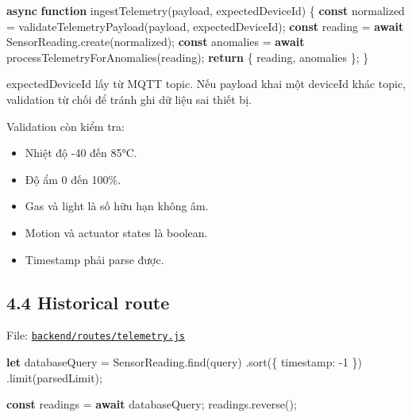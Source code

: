 \documentclass[11pt,oneside,openany]{book}
\renewcommand{\texttt}[1]{{\ttfamily\small #1}}
\newenvironment{Shaded}{\begin{snugshade}}{\end{snugshade}}
\newcommand{\ControlFlowTok}[1]{\textcolor[rgb]{0.99,0.74,0.29}{\textbf{#1}}}
\newcommand{\DataTypeTok}[1]{\textcolor[rgb]{0.16,0.50,0.73}{#1}}
\newcommand{\DecValTok}[1]{\textcolor[rgb]{0.96,0.45,0.00}{#1}}
\newcommand{\FunctionTok}[1]{\textcolor[rgb]{0.56,0.27,0.68}{#1}}
\newcommand{\KeywordTok}[1]{\textcolor[rgb]{0.81,0.81,0.76}{\textbf{#1}}}
\newcommand{\NormalTok}[1]{\textcolor[rgb]{0.81,0.81,0.76}{#1}}
\newcommand{\OperatorTok}[1]{\textcolor[rgb]{0.81,0.81,0.76}{#1}}
\renewenvironment{Shaded}{%
  \def\FrameCommand{\fboxsep=8pt\colorbox{shadecolor}}%
  \MakeFramed{\advance\hsize-\width\FrameRestore}%
}{\endMakeFramed}
\providecommand{\tightlist}{\setlength{\itemsep}{1pt}\setlength{\parskip}{0pt}}
\begin{document}
\begin{Shaded}
\begin{Highlighting}[]
\KeywordTok{async} \KeywordTok{function} \FunctionTok{ingestTelemetry}\NormalTok{(payload}\OperatorTok{,}\NormalTok{ expectedDeviceId) \{}
  \KeywordTok{const}\NormalTok{ normalized }\OperatorTok{=} \FunctionTok{validateTelemetryPayload}\NormalTok{(payload}\OperatorTok{,}\NormalTok{ expectedDeviceId)}\OperatorTok{;}
  \KeywordTok{const}\NormalTok{ reading }\OperatorTok{=} \ControlFlowTok{await}\NormalTok{ SensorReading}\OperatorTok{.}\FunctionTok{create}\NormalTok{(normalized)}\OperatorTok{;}
  \KeywordTok{const}\NormalTok{ anomalies }\OperatorTok{=} \ControlFlowTok{await} \FunctionTok{processTelemetryForAnomalies}\NormalTok{(reading)}\OperatorTok{;}
  \ControlFlowTok{return}\NormalTok{ \{ reading}\OperatorTok{,}\NormalTok{ anomalies \}}\OperatorTok{;}
\NormalTok{\}}
\end{Highlighting}
\end{Shaded}

\texttt{expectedDeviceId} lấy từ MQTT topic. Nếu payload khai một
deviceId khác topic, validation từ chối để tránh ghi dữ liệu sai thiết
bị.

Validation còn kiểm tra:

\begin{itemize}
\tightlist
\item
  Nhiệt độ -40 đến 85°C.
\item
  Độ ẩm 0 đến 100\%.
\item
  Gas và light là số hữu hạn không âm.
\item
  Motion và actuator states là boolean.
\item
  Timestamp phải parse được.
\end{itemize}

\subsection{4.4 Historical route}\label{44-historical-route}

File:
\href{../backend/routes/telemetry.js}{\nolinkurl{backend/routes/telemetry.js}}

\begin{Shaded}
\begin{Highlighting}[]
\KeywordTok{let}\NormalTok{ databaseQuery }\OperatorTok{=}\NormalTok{ SensorReading}\OperatorTok{.}\FunctionTok{find}\NormalTok{(query)}
  \OperatorTok{.}\FunctionTok{sort}\NormalTok{(\{ }\DataTypeTok{timestamp}\OperatorTok{:} \OperatorTok{{-}}\DecValTok{1}\NormalTok{ \})}
  \OperatorTok{.}\FunctionTok{limit}\NormalTok{(parsedLimit)}\OperatorTok{;}

\KeywordTok{const}\NormalTok{ readings }\OperatorTok{=} \ControlFlowTok{await}\NormalTok{ databaseQuery}\OperatorTok{;}
\NormalTok{readings}\OperatorTok{.}\FunctionTok{reverse}\NormalTok{()}\OperatorTok{;}
\end{Highlighting}
\end{Shaded}
\end{document}
